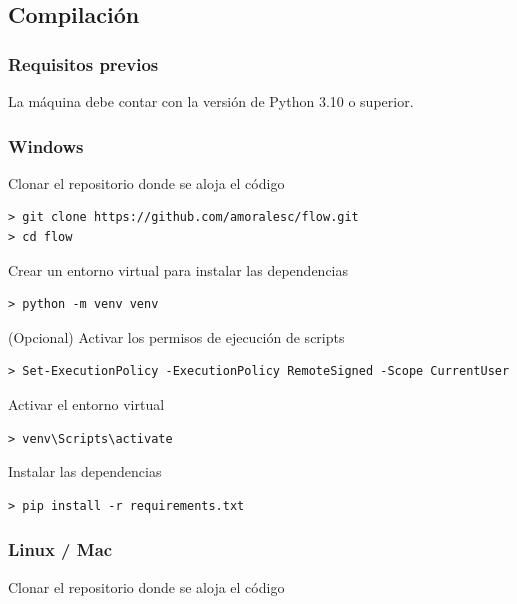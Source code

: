 \documentclass[letter,12pt]{article}
\begin{document}
\subsection{Compilación} \label{documentacion:compilacion}

\subsubsection{Requisitos previos} \label{documentacion:compilacion:requisitos}

La máquina debe contar con la versión de Python 3.10 o superior.

\subsubsection{Windows} \label{documentacion:compilacion:windows}

Clonar el repositorio donde se aloja el código

\begin{verbatim}
> git clone https://github.com/amoralesc/flow.git
> cd flow
\end{verbatim}

Crear un entorno virtual para instalar las dependencias

\begin{verbatim}
> python -m venv venv
\end{verbatim}

(Opcional) Activar los permisos de ejecución de scripts

\begin{verbatim}
> Set-ExecutionPolicy -ExecutionPolicy RemoteSigned -Scope CurrentUser
\end{verbatim}

Activar el entorno virtual

\begin{verbatim}
> venv\Scripts\activate
\end{verbatim}

Instalar las dependencias

\begin{verbatim}
> pip install -r requirements.txt
\end{verbatim}

\subsubsection{Linux / Mac} \label{documentacion:compilacion:linux}

Clonar el repositorio donde se aloja el código
\end{document}
